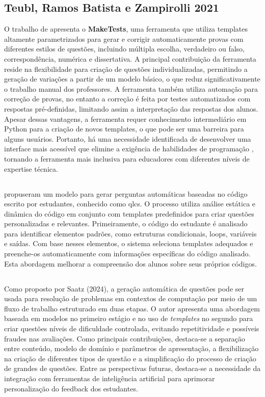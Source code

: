  \subsection{Teubl, Ramos Batista e Zampirolli 2021}
O trabalho de \parencite{teubl2021}  apresenta o \textbf{MakeTests}, uma ferramenta que utiliza templates altamente parametrizados para gerar e corrigir automaticamente provas com diferentes estilos de questões, incluindo múltipla escolha, verdadeiro ou falso, correspondência, numérica e dissertativa. A principal contribuição da ferramenta reside na flexibilidade para criação de questões individualizadas, permitindo a geração de variações a partir de um modelo básico, o que reduz significativamente o trabalho manual dos professores.  A ferramenta também utiliza automação para correção de provas, no entanto a correção é feita por testes automatizados com respostas pré-definidas, limitando assim a interpretação das respostas dos alunos. Apesar dessas vantagens, a ferramenta requer conhecimento intermediário em Python para a criação de novos templates, o que pode ser uma barreira para alguns usuários. Portanto, há uma necessidade identificada de desenvolver uma interface mais acessível que elimine a exigência de habilidades de programação , tornando a ferramenta mais inclusiva para educadores com diferentes níveis de expertise técnica. 

\subsection{}
\cite {lehtinen2021} propuseram um modelo para gerar perguntas automáticas baseadas no código escrito por estudantes, conhecido como  \gls{qlcs}. O processo utiliza análise estática e dinâmica do código em conjunto com templates predefinidos para criar questões personalizadas e relevantes. Primeiramente, o código do estudante é analisado para identificar elementos padrões, como estruturas condicionais, loops, variáveis e saídas. Com base nesses elementos, o sistema seleciona templates adequados e preenche-os automaticamente com informações específicas do código analisado. Esta abordagem melhorar a compreensão dos alunos sobre seus próprios códigos. 

 \subsection{}
Como proposto por Saatz (2024), a geração automática de questões pode ser usada para resolução de problemas em contextos de computação  por meio de um fluxo de trabalho estruturado em duas etapas. O autor apresenta uma abordagem baseada em modelos no primeiro estágio e no uso de \textit{templates}  no segundo para criar questões níveis de dificuldade controlada, evitando repetitividade e possíveis fraudes nas avaliações. Como principais contribuições, destaca-se a separação entre conteúdo, modelo de domínio e parâmetros de apresentação, a flexibilização na criação de diferentes tipos de questão e a simplificação do processo de criação de grandes de questões. Entre as perspectivas futuras, destaca-se a necessidade da integração com ferramentas de inteligência artificial para aprimorar personalização do feedback dos estudantes. 



